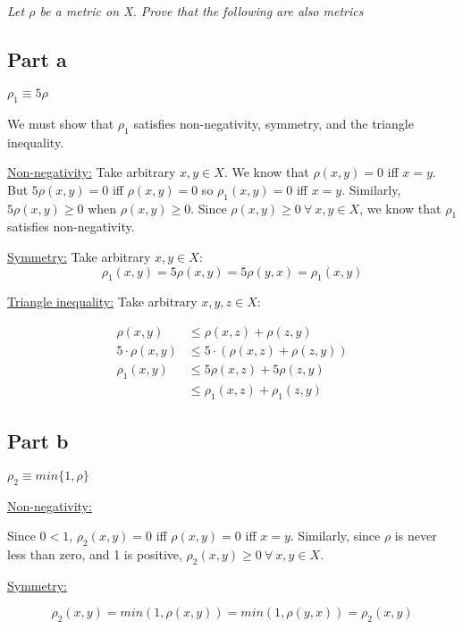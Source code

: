 \documentclass[]{article}
\begin{document}

	\section{}
		\emph{Let $\rho$ be a metric on X. Prove that the following are also metrics}
		\subsection*{Part a} 
			$\rho_1 \equiv 5 \rho$ 

			We must show that $\rho_1$ satisfies non-negativity, symmetry, and the triangle inequality. 

			\underline{Non-negativity:}
				Take arbitrary $x, y \in X$. We know that $\rho(x, y) = 0$ iff $x = y$. But $5 \rho(x, y) = 0$ iff $\rho(x, y) = 0$ so $\rho_1(x, y) = 0$ iff $x = y$. Similarly, $5\rho(x, y) \geq 0$ when $\rho(x, y) \geq 0$. Since $\rho(x, y) \geq 0\ \forall\ x, y \in X$, we know that $\rho_1$ satisfies non-negativity. 

			\underline{Symmetry:}
				Take arbitrary $x, y \in X$: 
				\[\rho_1(x, y) = 5 \rho(x, y) = 5 \rho(y, x) = \rho_1(x, y)\]

			\underline{Triangle inequality:} 
				Take arbitrary $x, y, z \in X$:

				\begin{align*}
					\rho(x, y) &\leq \rho(x, z) + \rho(z, y) \\
					5 \cdot \rho(x, y) &\leq 5 \cdot (\rho(x,z) + \rho(z, y)) \\
					\rho_1(x, y) &\leq 5\rho(x, z) + 5\rho(z, y) \\
					&\leq \rho_1(x, z) + \rho_1(z, y)
				\end{align*}

		\subsection*{Part b}
			$\rho_2 \equiv min\{1, \rho\}$

			\underline{Non-negativity:}

				Since $0 < 1$, $\rho_2(x, y) = 0$ iff $\rho(x, y) = 0$ iff $x = y$. Similarly, since $\rho$ is never less than zero, and 1 is positive, $\rho_2(x, y) \geq 0\ \forall\ x, y\in X$. 

			\underline{Symmetry:}

				\[
					\rho_2(x, y) = min(1, \rho(x, y)) = min(1, \rho(y, x)) = \rho_2(x, y)
				\]
\end{document}
